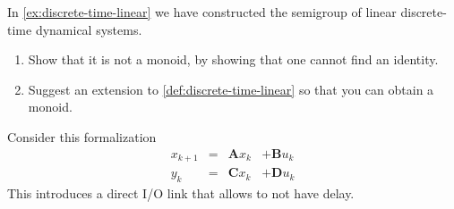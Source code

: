 \begin{exercise}
  In \cref{ex:discrete-time-linear} we have constructed the semigroup of linear discrete-time dynamical systems.

  \begin{enumerate}
    \item Show that it is not a monoid, by showing that one cannot find an identity.
    \item Suggest an extension to \cref{def:discrete-time-linear} so that you can obtain a monoid.
  \end{enumerate}
\end{exercise}
\begin{solution}
  Consider this formalization
   \begin{equation} \label{eq:discrete-time-dynamics-D}
      \begin{aligned}
        x_{k+1} &=& \mathbf{A} x_k & + \mathbf{B} u_k \\
        y_{k}   &=& \mathbf{C} x_k & + \mathbf{D} u_k
      \end{aligned}
    \end{equation}
  This introduces a direct I/O link that allows to not have delay.


\end{solution}

